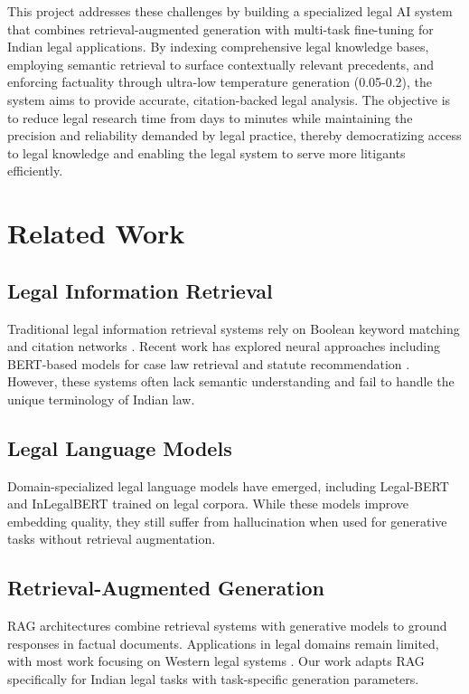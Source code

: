 \documentclass[11pt]{article}
\begin{document}
This project addresses these challenges by building a specialized legal AI system that combines retrieval-augmented generation with multi-task fine-tuning for Indian legal applications. By indexing comprehensive legal knowledge bases, employing semantic retrieval to surface contextually relevant precedents, and enforcing factuality through ultra-low temperature generation (0.05-0.2), the system aims to provide accurate, citation-backed legal analysis. The objective is to reduce legal research time from days to minutes while maintaining the precision and reliability demanded by legal practice, thereby democratizing access to legal knowledge and enabling the legal system to serve more litigants efficiently.

\section{Related Work}

\subsection{Legal Information Retrieval}

Traditional legal information retrieval systems rely on Boolean keyword matching and citation networks \cite{maxwell2013legal}. Recent work has explored neural approaches including BERT-based models for case law retrieval \cite{shao2020bert} and statute recommendation \cite{zhong2020does}. However, these systems often lack semantic understanding and fail to handle the unique terminology of Indian law.

\subsection{Legal Language Models}

Domain-specialized legal language models have emerged, including Legal-BERT \cite{chalkidis2020legal} and InLegalBERT \cite{paul2023inlegalbert} trained on legal corpora. While these models improve embedding quality, they still suffer from hallucination when used for generative tasks without retrieval augmentation.

\subsection{Retrieval-Augmented Generation}

RAG architectures \cite{lewis2020retrieval} combine retrieval systems with generative models to ground responses in factual documents. Applications in legal domains remain limited, with most work focusing on Western legal systems \cite{louis2022question}. Our work adapts RAG specifically for Indian legal tasks with task-specific generation parameters.
\end{document}
